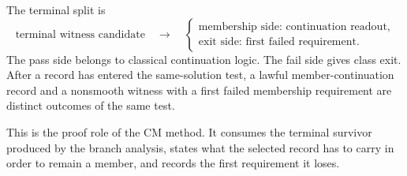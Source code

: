 The terminal split is
\[
  \text{terminal witness candidate}
  \quad\longrightarrow\quad
  \begin{cases}
  \text{membership side: continuation readout},\\
  \text{exit side: first failed requirement}.
  \end{cases}
\]
The pass side belongs to classical continuation logic.  The fail side gives class exit.  After a record has entered the same-solution test, a lawful member-continuation record and a nonsmooth witness with a first failed membership requirement are distinct outcomes of the same test.

This is the proof role of the CM method.  It consumes the terminal survivor produced by the branch analysis, states what the selected record has to carry in order to remain a member, and records the first requirement it loses.
